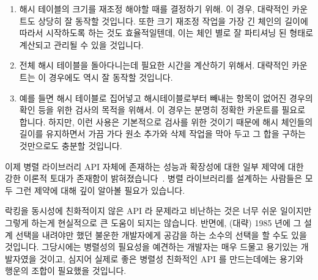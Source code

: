 \begin{enumerate}
\item	해시 테이블의 크기를 재조정 해야할 때를 결정하기 위해.
	이 경우, 대략적인 카운트도 상당히 잘 동작할 것입니다.
	또한 크기 재조정 작업을 가장 긴 체인의 길이에 따라서 시작하도록 하는
	것도 효율적일텐데, 이는 체인 별로 잘 파티셔닝 된 형태로 계산되고 관리될
	수 있을 것입니다.
\item	전체 해시 테이블을 돌아다니는데 필요한 시간을 계산하기 위해서.
	대략적인 카운트는 이 경우에도 역시 잘 동작할 것입니다.
\item	예를 들면 해시 테이블로 집어넣고 해시테이블로부터 빼내는 항목이 없어진
	경우의 확인 등을 위한 검사의 목적을 위해서.
	이 경우는 분명히 정확한 카운트를 필요로 합니다.
	하지만, 이런 사용은 기본적으로 검사를 위한 것이기 때문에 해시 체인들의
	길이를 유지하면서 가끔 가다 원소 추가와 삭제 작업을 막아 두고 그 합을
	구하는 것만으로도 충분할 것입니다.

\end{enumerate}

이제 병렬 라이브러리 API 자체에 존재하는 성능과 확장성에 대한 일부 제약에 대한
강한 이론적 토대가 존재함이
밝혀졌습니다~\cite{HagitAttiya2011LawsOfOrder,Attiya:2011:LOE:1925844.1926442,PaulEMcKenney2011SNC}.
병렬 라이브러리를 설계하는 사람들은 모두 그런 제약에 대해 깊이 알아볼 필요가
있습니다.

락킹을 동시성에 친화적이지 않은 API 라 문제라고 비난하는 것은 너무 쉬운
일이지만 그렇게 하는게 현실적으로 큰 도움이 되지는 않습니다.
반면에, (대략) 1985 년에 그 설계 선택을 내려야만 했던 불운한 개발자에게 공감을
하는 소수의 선택을 할 수도 있을 것입니다.
그당시에는 병렬성의 필요성을 예견하는 개발자는 매우 드물고 용기있는 개발자였을
것이고, 심지어 실제로 좋은 병렬성 친화적인 API 를 만드는데에는 용기와 행운의
조합이 필요했을 것입니다.
\iffalse

